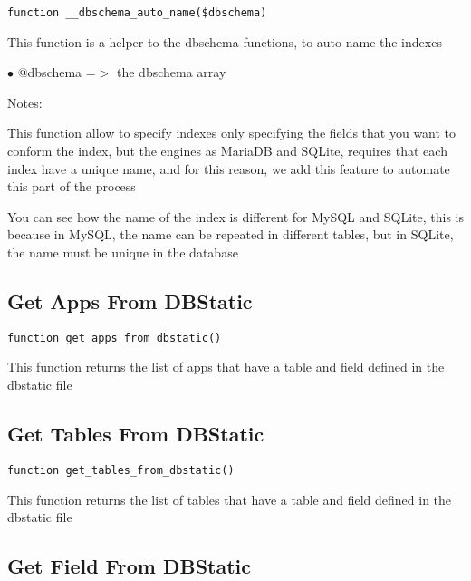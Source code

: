 \documentclass[a4paper]{book}
\begin{document}
\begin{lstlisting}
function __dbschema_auto_name($dbschema)
\end{lstlisting}

This function is a helper to the dbschema functions, to auto name the indexes

\begin{compactitem}
\item[\color{myblue}$\bullet$] @dbschema =$>$ the dbschema array
\end{compactitem}

Notes:

This function allow to specify indexes only specifying the fields that you want
to conform the index, but the engines as MariaDB and SQLite, requires that each
index have a unique name, and for this reason, we add this feature to automate
this part of the process

You can see how the name of the index is different for MySQL and SQLite, this is
because in MySQL, the name can be repeated in different tables, but in SQLite,
the name must be unique in the database

\hypertarget{toc99}{}
\subsection{Get Apps From DBStatic}

\begin{lstlisting}
function get_apps_from_dbstatic()
\end{lstlisting}

This function returns the list of apps that have a table and field defined
in the dbstatic file

\hypertarget{toc100}{}
\subsection{Get Tables From DBStatic}

\begin{lstlisting}
function get_tables_from_dbstatic()
\end{lstlisting}

This function returns the list of tables that have a table and field defined
in the dbstatic file

\hypertarget{toc101}{}
\subsection{Get Field From DBStatic}
\end{document}
